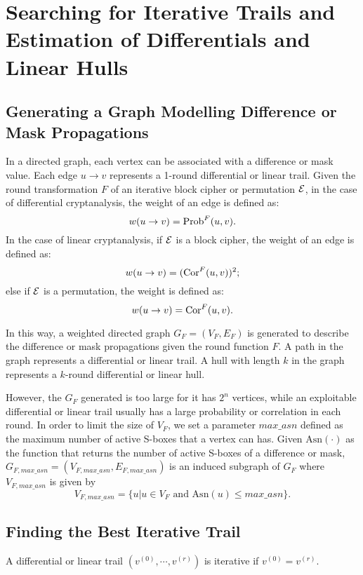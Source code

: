 \section{Searching for Iterative Trails and Estimation of Differentials and Linear Hulls\label{sec:method}}

\subsection{Generating a Graph Modelling Difference or Mask Propagations}

In a directed graph, each vertex can be associated with a difference or mask value. Each edge $u\rightarrow v$ represents a 1-round differential or linear trail. Given the round transformation $F$ of an iterative block cipher or permutation $\mathcal{E}$, in the case of differential cryptanalysis, the weight of an edge is defined as:
\[
    w(u\rightarrow v)=\text{Prob}^{F}(u,v).
\]
In the case of linear cryptanalysis, if $\mathcal{E}$ is a block cipher, the weight of an edge is defined as:
\[
    w(u\rightarrow v)=(\text{Cor}^{F}(u,v))^2;
\]
else if $\mathcal{E}$ is a permutation, the weight is defined as:
\[
    w(u\rightarrow v)=\text{Cor}^{F}(u,v).
\]

In this way, a weighted directed graph $G_{F}=(V_{F},E_{F})$ is generated to describe the difference or mask propagations given the round function $F$. A path in the graph represents a differential or linear trail. A hull with length $k$ in the graph represents a $k$-round differential or linear hull. 

However, the $G_F$ generated is too large for it has $2^n$ vertices, while an exploitable differential or linear trail usually has a large probability or correlation in each round. In order to limit the size of $V_F$, we set a parameter $max\_asn$ defined as the maximum number of active S-boxes that a vertex can has. Given $\text{Asn}(\cdot)$ as the function that returns the number of active S-boxes of a difference or mask, $G_{F,max\_asn}=(V_{F,max\_asn},E_{F,max\_asn})$ is an induced subgraph of $G_F$ where $V_{F,max\_asn}$ is given by
\[
    V_{F,max\_asn}=\{u|u\in V_F \text{ and } \text{Asn}(u)\leq max\_asn\}.
\]

\subsection{Finding the Best Iterative Trail}\label{sec:fbit}

\begin{definition}\label{def:it}
	A differential or linear trail $(v^{(0)},\cdots,v^{(r)})$ is iterative if $v^{(0)}=v^{(r)}$.
\end{definition}

